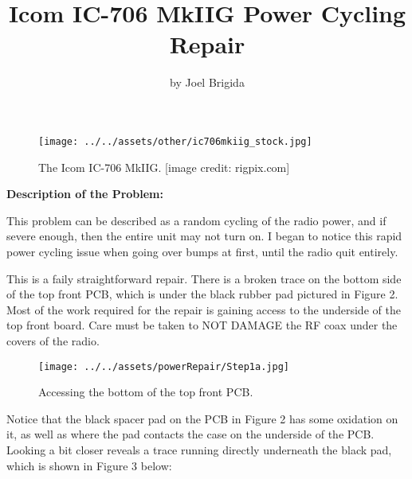 \documentclass[11pt, letterpaper]{article}
\title{Icom IC-706 MkIIG Power Cycling Repair}
\author{by Joel Brigida}
\date{} %
\begin{document}
\maketitle
\thispagestyle{empty} %

\hfill \break
\hfill \break
\hfill \break

\begin{figure}[H] %
    \centering %
    \texttt{[image: ../../assets/other/ic706mkiig\_stock.jpg]} %
    \caption{The Icom IC-706 MkIIG. [image credit: rigpix.com]} %
\end{figure}

\newpage
\setcounter{page}{1} %

\begin{center}
    \textbf{Description of the Problem:}
\end{center}

\hspace{\parindent}This problem can be described as a random cycling of the radio power, and if severe enough,
then the entire unit may not turn on. I began to notice this rapid power cycling issue when going over bumps
at first, until the radio quit entirely.

\hspace{\parindent}This is a faily straightforward repair. There is a broken trace on the bottom side of the top
front PCB, which is under the black rubber pad pictured in Figure 2. Most of the work required for the repair is 
gaining access to the underside of the top front board. Care must be taken to NOT DAMAGE the RF coax under the
covers of the radio.

\begin{figure}[H] %
    \centering %
    \texttt{[image: ../../assets/powerRepair/Step1a.jpg]} %
    \caption{Accessing the bottom of the top front PCB.} %
\end{figure}

\hspace{\parindent}Notice that the black spacer pad on the PCB in Figure 2 has some oxidation on it, as well as 
where the pad contacts the case on the underside of the PCB. Looking a bit closer reveals a trace running directly 
underneath the black pad, which is shown in Figure 3 below:
\end{document}
